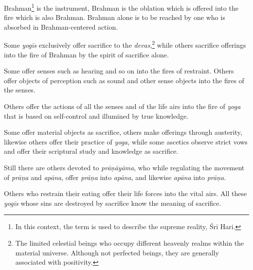 {Brahman\footnote{In this context, the term is used to describe the supreme reality, Śrī Hari.} is the instrument, Brahman is the oblation which is offered into the fire which is also Brahman. Brahman alone is to be reached by one who is absorbed in Brahman-centered action.}

{Some \textit{yogīs} exclusively offer sacrifice to the \textit{devas},\footnote{The limited celestial beings who occupy different heavenly realms within the material universe. Although not perfected beings, they are generally associated with positivity.} while others sacrifice offerings into the fire of Brahman by the spirit of sacrifice alone.}

{Some offer senses such as hearing and so on into the fires of restraint. Others offer objects of perception such as sound and other sense objects into the fires of the senses.}

{Others offer the actions of all the senses and of the life airs into the fire of \textit{yoga} that is based on self-control and illumined by true knowledge.}

{Some offer material objects as sacrifice, others make offerings through austerity, likewise others offer their practice of \textit{yoga}, while some ascetics observe strict vows and offer their scriptural study and knowledge as sacrifice.}

{Still there are others devoted to \textit{prāṇāyāma}, who while regulating the movement of \textit{prāṇa} and \textit{apāna}, offer \textit{prāṇa} into \textit{apāna}, and likewise \textit{apāna} into \textit{prāṇa}.}

{Others who restrain their eating offer their life forces into the vital airs. All these \textit{yogīs} whose sins are destroyed by sacrifice know the meaning of sacrifice.}


